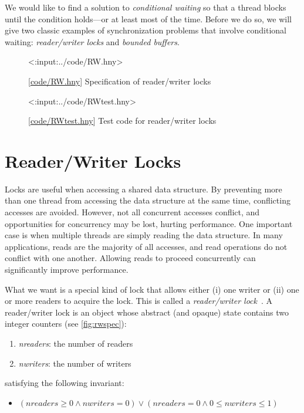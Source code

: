 \documentclass{report}
\newcommand{\harmonylink}[1]{%
[\href{https://harmony.cs.cornell.edu/#1}{\underline{#1}}]%
}
\newenvironment{code}{
\tcolorbox
}{
\endtcolorbox
}
\begin{document}
{We would like to find a solution to \emph{conditional waiting}
so that a thread blocks until the condition holds---or at least most
of the time.
Before we do so, we will give two classic examples of synchronization
problems that involve conditional waiting: \emph{reader/writer locks}
and \emph{bounded buffers}.

\begin{figure}
\begin{code}
<{:input:../code/RW.hny}>
\end{code}
\caption{\harmonylink{code/RW.hny} Specification of reader/writer locks}
\label{fig:rwspec}
\end{figure}

\begin{figure}
\begin{code}
<{:input:../code/RWtest.hny}>
\end{code}
\caption{\harmonylink{code/RWtest.hny} Test code for reader/writer locks}
\label{fig:rwtest}
\end{figure}

\section{Reader/Writer Locks}
%
%

Locks are useful when accessing a shared data structure.  By preventing
more than one thread from accessing the data structure at the same
time, conflicting accesses are avoided.  However, not all concurrent
accesses conflict, and opportunities for concurrency may be lost,
hurting performance.  One important case is when multiple threads
are simply reading the data structure.
In many applications, reads are the majority of all accesses,
and read operations do not conflict with one another.
Allowing reads to proceed concurrently can significantly improve performance.

What we want is a special kind of lock that allows either (i) one writer
or (ii) one or more readers to acquire the lock.  This is called
a \emph{reader/writer lock}~\cite{CHP71}.
%
A reader/writer lock is an object whose abstract (and opaque)
state contains two integer counters (see \autoref{fig:rwspec}):
\begin{enumerate}
\item \textit{nreaders}: the number of readers
\item \textit{nwriters}: the number of writers
\end{enumerate}
satisfying the following invariant:
\begin{itemize}
\item [] $(\mathit{nreaders} \ge 0 \land \mathit{nwriters} = 0) \lor
    (\mathit{nreaders} = 0 \land 0 \le \mathit{nwriters} \le 1)$
\end{itemize}

}
\end{document}
